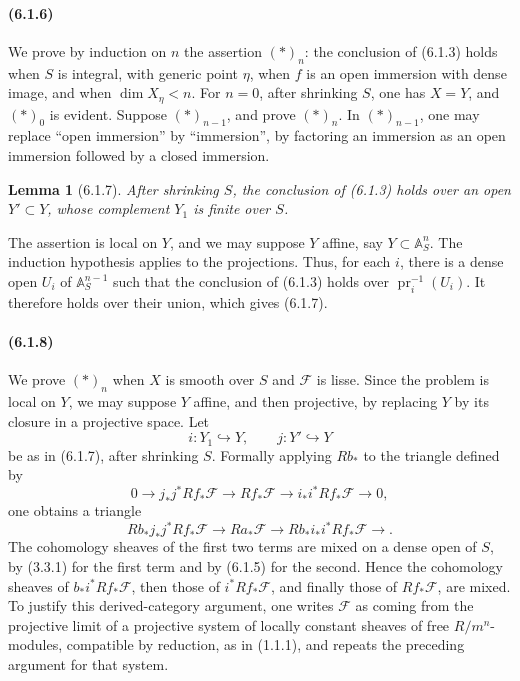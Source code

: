 \documentclass[11pt]{article}
\newtheorem{lemma}{Lemma}
\theoremstyle{remark}
\begin{document}
\paragraph{(6.1.6)}
We prove by induction on \(n\) the assertion \((*)_n\): the conclusion of (6.1.3) holds when \(S\) is integral, with generic point \(\eta\), when \(f\) is an open immersion with dense image, and when \(\dim X_\eta<n\).  For \(n=0\), after shrinking \(S\), one has \(X=Y\), and \((*)_0\) is evident.  Suppose \((*)_{n-1}\), and prove \((*)_n\).  In \((*)_{n-1}\), one may replace ``open immersion'' by ``immersion'', by factoring an immersion as an open immersion followed by a closed immersion.

\begin{lemma}[6.1.7]
After shrinking \(S\), the conclusion of (6.1.3) holds over an open \(Y'\subset Y\), whose complement \(Y_1\) is finite over \(S\).
\end{lemma}

The assertion is local on \(Y\), and we may suppose \(Y\) affine, say \(Y\subset \mathbb A^n_S\).  The induction hypothesis applies to the projections.  Thus, for each \(i\), there is a dense open \(U_i\) of \(\mathbb A^{n-1}_S\) such that the conclusion of (6.1.3) holds over \(\operatorname{pr}_i^{-1}(U_i)\).  It therefore holds over their union, which gives (6.1.7).

\paragraph{(6.1.8)}
We prove \((*)_n\) when \(X\) is smooth over \(S\) and \(\mathcal F\) is lisse.  Since the problem is local on \(Y\), we may suppose \(Y\) affine, and then projective, by replacing \(Y\) by its closure in a projective space.  Let
\[
 i:Y_1\hookrightarrow Y,
 \qquad j:Y'\hookrightarrow Y
\]
be as in (6.1.7), after shrinking \(S\).  Formally applying \(Rb_*\) to the triangle defined by
\[
0\longrightarrow j_*j^*Rf_*\mathcal F
\longrightarrow Rf_*\mathcal F
\longrightarrow i_*i^*Rf_*\mathcal F
\longrightarrow 0,
\]
one obtains a triangle
\[
Rb_*j_*j^*Rf_*\mathcal F\longrightarrow Ra_*\mathcal F
\longrightarrow Rb_*i_*i^*Rf_*\mathcal F\longrightarrow.
\]
The cohomology sheaves of the first two terms are mixed on a dense open of \(S\), by (3.3.1) for the first term and by (6.1.5) for the second.  Hence the cohomology sheaves of \(b_*i^*Rf_*\mathcal F\), then those of \(i^*Rf_*\mathcal F\), and finally those of \(Rf_*\mathcal F\), are mixed.  To justify this derived-category argument, one writes \(\mathcal F\) as coming from the projective limit of a projective system of locally constant sheaves of free \(R/m^n\)-modules, compatible by reduction, as in (1.1.1), and repeats the preceding argument for that system.
\end{document}

